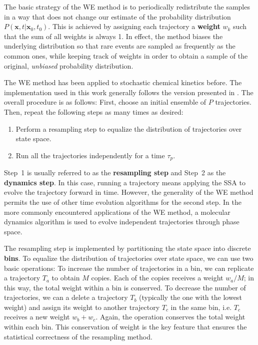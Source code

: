 \documentclass[english,letterpaper,12pt]{report}
\newcommand{\defkeywd}[1]{\textbf{#1}}
\renewcommand{\vec}[1]{\ensuremath{\mathbf{#1}}}
\begin{document}
\begin{doublespacing}
The basic strategy of the WE method is to periodically redistribute the samples in a way that does not change our estimate of the probability distribution $P(\vec{x}, t | \vec{x}_0, t_0)$. This is achieved by assigning each trajectory a \defkeywd{weight} $w_k$ such that the sum of all weights is always 1. In effect, the method biases the underlying distribution so that rare events are sampled as frequently as the common ones, while keeping track of weights in order to obtain a sample of the original, \emph{unbiased} probability distribution.

The WE method has been applied to stochastic chemical kinetics before. The implementation used in this work generally follows the version presented in \cite{we-chemkin}. The overall procedure is as follows: First, choose an initial ensemble of $P$ trajectories. Then, repeat the following steps as many times as desired:
\begin{enumerate}
    \item Perform a resampling step to equalize the distribution of trajectories over state space.
    \item Run all the trajectories independently for a time $\tau_p$.
\end{enumerate}
Step~1 is usually referred to as the \defkeywd{resampling step} and Step~2 as the \defkeywd{dynamics step}. In this case, running a trajectory means applying the SSA to evolve the trajectory forward in time. However, the generality of the WE method permits the use of other time evolution algorithms for the second step. In the more commonly encountered applications of the WE method, a molecular dynamics algorithm is used to evolve independent trajectories through phase space.

The resampling step is implemented by partitioning the state space into discrete \defkeywd{bins}. To equalize the distribution of trajectories over state space, we can use two basic operations: To increase the number of trajectories in a bin, we can replicate a trajectory $T_a$ to obtain $M$ copies. Each of the copies receives a weight $w_a/M$; in this way, the total weight within a bin is conserved. To decrease the number of trajectories,  we can a delete a trajectory $T_b$ (typically the one with the lowest weight) and assign its weight to another trajectory $T_c$ in the same bin, i.e. $T_c$ receives a new weight $w_b + w_c$. Again, the operation conserves the total weight within each bin. This conservation of weight is the key feature that ensures the statistical correctness of the resampling method.


\end{doublespacing}
\end{document}
